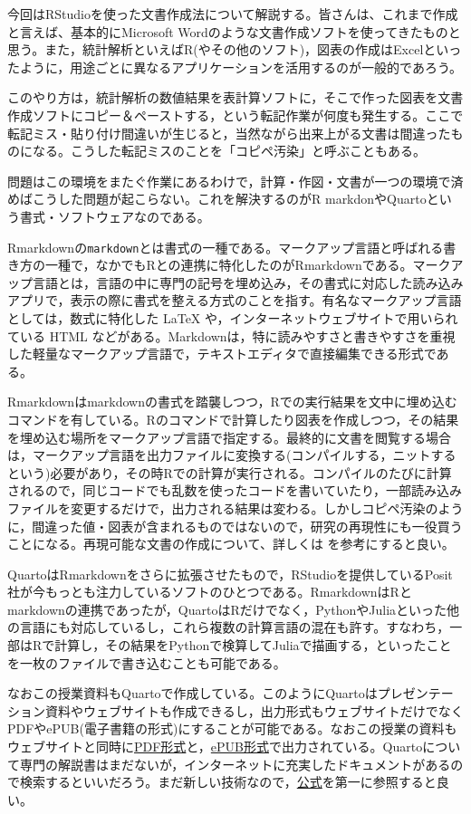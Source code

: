 \documentclass[
  a4paper,
]{ltjsbook}
\begin{document}
今回はRStudioを使った文書作成法について解説する。皆さんは、これまで作成と言えば、基本的にMicrosoft
Wordのような文書作成ソフトを使ってきたものと思う。また，統計解析といえばR(やその他のソフト)，図表の作成はExcelといったように，用途ごとに異なるアプリケーションを活用するのが一般的であろう。

このやり方は，統計解析の数値結果を表計算ソフトに，そこで作った図表を文書作成ソフトにコピー＆ペーストする，という転記作業が何度も発生する。ここで転記ミス・貼り付け間違いが生じると，当然ながら出来上がる文書は間違ったものになる。こうした転記ミスのことを「コピペ汚染」と呼ぶこともある。

問題はこの環境をまたぐ作業にあるわけで，計算・作図・文書が一つの環境で済めばこうした問題が起こらない。これを解決するのがR
markdonやQuartoという書式・ソフトウェアなのである。

Rmarkdownの\texttt{markdown}とは書式の一種である。マークアップ言語と呼ばれる書き方の一種で，なかでもRとの連携に特化したのがRmarkdownである。マークアップ言語とは，言語の中に専門の記号を埋め込み，その書式に対応した読み込みアプリで，表示の際に書式を整える方式のことを指す。有名なマークアップ言語としては，数式に特化した
LaTeX や，インターネットウェブサイトで用いられている HTML
などがある。Markdownは，特に読みやすさと書きやすさを重視した軽量なマークアップ言語で，テキストエディタで直接編集できる形式である。

Rmarkdownはmarkdownの書式を踏襲しつつ，Rでの実行結果を文中に埋め込むコマンドを有している。Rのコマンドで計算したり図表を作成しつつ，その結果を埋め込む場所をマークアップ言語で指定する。最終的に文書を閲覧する場合は，マークアップ言語を出力ファイルに変換する(コンパイルする，ニットするという)必要があり，その時Rでの計算が実行される。コンパイルのたびに計算されるので，同じコードでも乱数を使ったコードを書いていたり，一部読み込みファイルを変更するだけで，出力される結果は変わる。しかしコピペ汚染のように，間違った値・図表が含まれるものではないので，研究の再現性にも一役買うことになる。再現可能な文書の作成について、詳しくは
\textcite{Takahashi201805} を参考にすると良い。

QuartoはRmarkdownをさらに拡張させたもので，RStudioを提供しているPosit社が今もっとも注力しているソフトのひとつである。RmarkdownはRとmarkdownの連携であったが，QuartoはRだけでなく，PythonやJuliaといった他の言語にも対応しているし，これら複数の計算言語の混在も許す。すなわち，一部はRで計算し，その結果をPythonで検算してJuliaで描画する，といったことを一枚のファイルで書き込むことも可能である。

なおこの授業資料もQuartoで作成している。このようにQuartoはプレゼンテーション資料やウェブサイトも作成できるし，出力形式もウェブサイトだけでなくPDFやePUB(電子書籍の形式)にすることが可能である。なおこの授業の資料もウェブサイトと同時に\href{心理学統計実習.PDF}{PDF形式}と，\href{心理学統計実習.epub}{ePUB形式}で出力されている。Quartoについて専門の解説書はまだないが，インターネットに充実したドキュメントがあるので検索するといいだろう。まだ新しい技術なので，\href{https://quarto.org/}{公式}を第一に参照すると良い。
\end{document}
